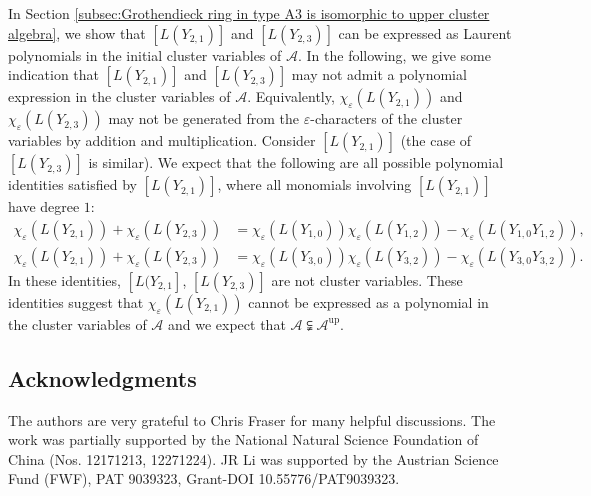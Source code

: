 \documentclass[11pt, reqno]{amsart}
\theoremstyle{plain}
\theoremstyle{definition}
\numberwithin{equation}{section}
\begin{document}
In Section \ref{subsec:Grothendieck ring in type A3 is isomorphic to upper cluster algebra}, we show that $[L(Y_{2,1})]$ and $[L(Y_{2,3})]$ can be expressed as Laurent polynomials in the initial cluster variables of $\mathcal{A}$. In the following, we give some indication that $[L(Y_{2,1})]$ and $[L(Y_{2,3})]$ may not admit a polynomial expression in the cluster variables of $\mathcal{A}$. Equivalently, $\chi_\varepsilon(L(Y_{2,1}))$ and $\chi_\varepsilon(L(Y_{2,3}))$ may not be generated from the $\varepsilon$-characters of the cluster variables by addition and multiplication. Consider $[L(Y_{2,1})]$ (the case of $[L(Y_{2,3})]$ is similar). We expect that the following are all possible polynomial identities satisfied by $[L(Y_{2,1})]$, where all monomials involving $[L(Y_{2,1})]$ have degree $1$:
\begin{align*} 
\chi_\varepsilon(L(Y_{2,1}))+\chi_\varepsilon(L(Y_{2,3}))
&=\chi_\varepsilon(L(Y_{1,0}))\chi_\varepsilon(L(Y_{1,2}))-\chi_\varepsilon(L(Y_{1,0}Y_{1,2})),\\
\chi_\varepsilon(L(Y_{2,1}))+\chi_\varepsilon(L(Y_{2,3}))
&=\chi_\varepsilon(L(Y_{3,0}))\chi_\varepsilon(L(Y_{3,2}))-\chi_\varepsilon(L(Y_{3,0}Y_{3,2})).
\end{align*}
In these identities, $[L(Y_{2,1}]$, $[L(Y_{2,3})]$ are not cluster variables. These identities suggest that $\chi_\varepsilon(L(Y_{2,1}))$ cannot be expressed as a polynomial in the cluster variables of $\mathcal{A}$ and we expect that $\mathcal{A} \subsetneqq \mathcal{A}^{\mathrm{up}}$.

\subsection*{Acknowledgments}
The authors are very grateful to Chris Fraser for many helpful discussions.
The work was partially supported by the National Natural Science Foundation of China (Nos. 12171213, 12271224). JR Li was supported by the Austrian Science Fund (FWF), PAT 9039323, Grant-DOI 10.55776/PAT9039323.
\end{document}

